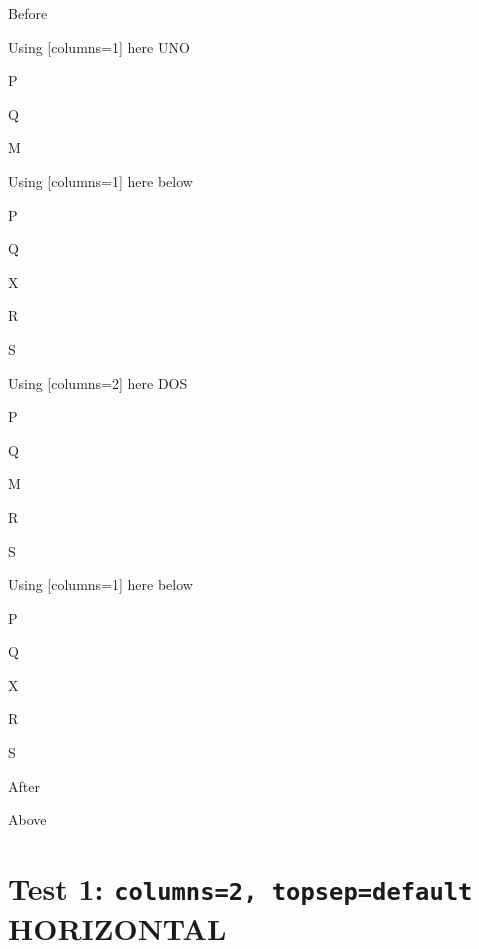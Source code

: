 \documentclass[12pt]{article}
\begin{document}
Before
\begin{enumext}[columns=2,nosep]%

\item Using [columns=1] here UNO

  \begin{enumext}[columns=1,nosep]%
     \item  P \item Q \item M %
  \end{enumext}

\item Using [columns=1] here below
\begin{enumext}[columns=1]%
     \item  P \item Q \item X  \item R \item S
  \end{enumext}

\columnbreak

\item Using [columns=2] here DOS

  \begin{enumext}[columns=2,nosep]%
    \item  P \item Q \item M \item R \item S
  \end{enumext}

\item Using [columns=1] here below
\begin{enumext}[columns=1]%
     \item  P \item Q \item X  \item R \item S
  \end{enumext}

\end{enumext}
After


Above

\newpage

\section{Test 1: \texttt{columns=2, topsep=default} HORIZONTAL}
\end{document}
